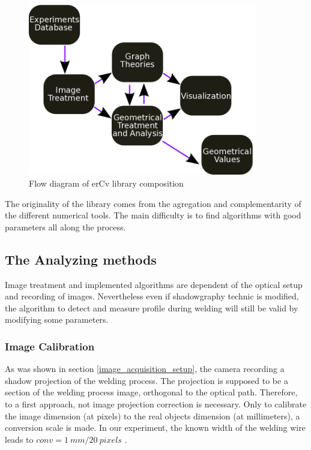 \documentclass[12pt]{iopart}
\begin{document}
\begin{figure}
\begin{center}
\includegraphics[width=10cm]{images/schema-erCv.png}
\caption{{\small Flow diagram of erCv library composition}}
\label{schema-erCv}
\end{center}
\end{figure}

The originality of the library comes from the agregation 
and complementarity of the different numerical tools.
The main difficulty is to find algorithms with good parameters all along the process.

\subsection{ The Analyzing methods}
\label{ the-analyze-methods}
Image treatment and implemented algorithms are dependent of the optical setup and recording of images.
Nevertheless even if shadowgraphy technic is modified, the algorithm to detect and measure profile during
welding will still be valid by modifying some parameters.
\subsubsection{ Image Calibration}

As was shown in section \ref{image_acquisition_setup}, the camera recording a 
shadow projection of the welding process. The projection is 
supposed to be a section of the welding process image, orthogonal to the optical path.
Therefore, to a first approach, not image projection 
correction is necessary. Only to calibrate the image dimension 
(at pixels) to the real objects dimension (at millimeters), a conversion scale is 
made. In our experiment, the known width of the welding wire leads to $conv = 1\ mm/ 20\ pixels$ . 
  
\end{document}
